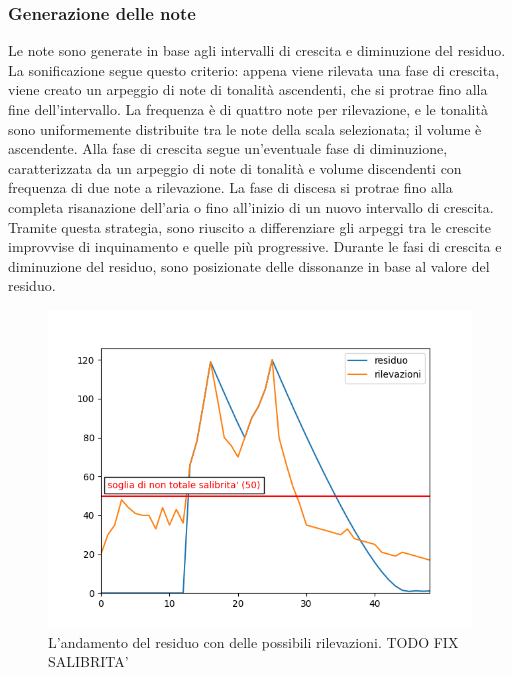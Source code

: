 \subsubsection{Generazione delle note}
Le note sono generate in base agli intervalli di crescita e diminuzione del residuo.
La sonificazione segue questo criterio: appena viene rilevata una fase di crescita, viene creato un arpeggio di note di tonalità ascendenti, che si protrae fino alla fine dell'intervallo.
La frequenza è di quattro note per rilevazione, e le tonalità sono uniformemente distribuite tra le note della scala selezionata; il volume è ascendente.
Alla fase di crescita segue un'eventuale fase di diminuzione, caratterizzata da un arpeggio di note di tonalità e volume discendenti con frequenza di due note a rilevazione. La fase
di discesa si protrae fino alla completa risanazione dell'aria o fino all'inizio di un nuovo intervallo di crescita.
Tramite questa strategia, sono riuscito a differenziare gli arpeggi tra le crescite improvvise di inquinamento e quelle più progressive.
Durante le fasi di crescita e diminuzione del residuo, sono posizionate delle dissonanze in base al valore del residuo.
\begin{figure}[h]
  \includegraphics[width=\linewidth]{img/residue.png}
  \caption{L'andamento del residuo con delle possibili rilevazioni.  TODO FIX SALIBRITA'}
  \label{fig:residue}
\end{figure}

